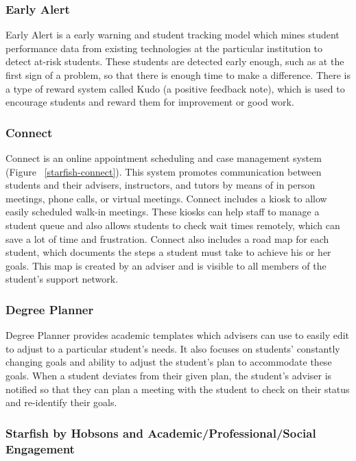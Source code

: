 \subsubsection{Early Alert}

Early Alert is a early warning and student tracking model which mines student performance data from existing technologies at the particular institution to detect at-risk students. These students are detected early enough, such as at the first sign of a problem, so that there is enough time to make a difference. There is a type of reward system called Kudo (a positive feedback note), which is used to encourage students and reward them for improvement or good work. 

\subsubsection{Connect}

Connect is an online appointment scheduling and case management system (Figure ~\ref{starfish-connect}). This system promotes communication between students and their advisers, instructors, and tutors by means of in person meetings, phone calls, or virtual meetings. Connect includes a kiosk to allow easily scheduled walk-in meetings. These kiosks can help staff to manage a student queue and also allows students to check wait times remotely, which can save a lot of time and frustration. Connect also includes a road map for each student, which documents the steps a student must take to achieve his or her goals. This map is created by an adviser and is visible to all members of the student's support network. 

\subsubsection{Degree Planner}

Degree Planner provides academic templates which advisers can use to easily edit to adjust to a particular student's needs. It also focuses on students' constantly changing goals and ability to adjust the student's plan to accommodate these goals. When a student deviates from their given plan, the student's adviser is notified so that they can plan a meeting with the student to check on their status and re-identify their goals. 

\subsubsection{Starfish by Hobsons and Academic/Professional/Social Engagement}

